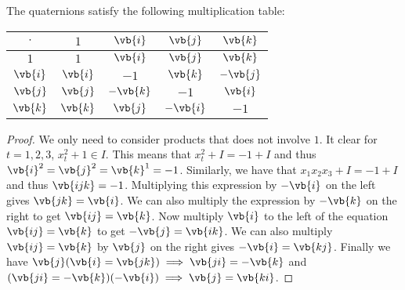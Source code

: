 \documentclass[a4paper]{article}
\begin{document}
\begin{prp}{}{} The quaternions satisfy the following multiplication table: \begin{center}
\begin{tabular}{ |c|c|c|c|c| } 
\hline
$\cdot$ & $1$ & $\vb{i}$ & $\vb{j}$ & $\vb{k}$\\\hline
$1$ & $1$ & $\vb{i}$ & $\vb{j}$ & $\vb{k}$\\\hline
$\vb{i}$ & $\vb{i}$ & $-1$& $\vb{k}$ & $-\vb{j}$ \\\hline
$\vb{j}$ & $\vb{j}$& $-\vb{k}$& $-1$& $\vb{i}$\\\hline
$\vb{k}$ & $\vb{k}$ & $\vb{j}$ & $-\vb{i}$ & $-1$\\\hline
\end{tabular}
\end{center}\tcbline
\begin{proof}
We only need to consider products that does not involve $1$. It clear for $t=1,2,3$, $x_t^2+1\in I$. This means that $x_t^2+I=-1+I$ and thus $\vb{i}^2=\vb{j}^2=\vb{k}^1=-1$. Similarly, we have that $x_1x_2x_3+I=-1+I$ and thus $\vb{ijk}=-1$. Multiplying this expression by $-\vb{i}$ on the left gives $\vb{jk}=\vb{i}$. We can also multiply the expression by $-\vb{k}$ on the right to get $\vb{ij}=\vb{k}$. Now multiply $\vb{i}$ to the left of the equation $\vb{ij}=\vb{k}$ to get $-\vb{j}=\vb{ik}$. We can also multiply $\vb{ij}=\vb{k}$ by $\vb{j}$ on the right gives $-\vb{i}=\vb{kj}$. Finally we have $\vb{j}(\vb{i}=\vb{jk})\implies\vb{ji}=-\vb{k}$ and $(\vb{ji}=-\vb{k})(-\vb{i})\implies\vb{j}=\vb{ki}$. 
\end{proof}
\end{prp}
\end{document}

